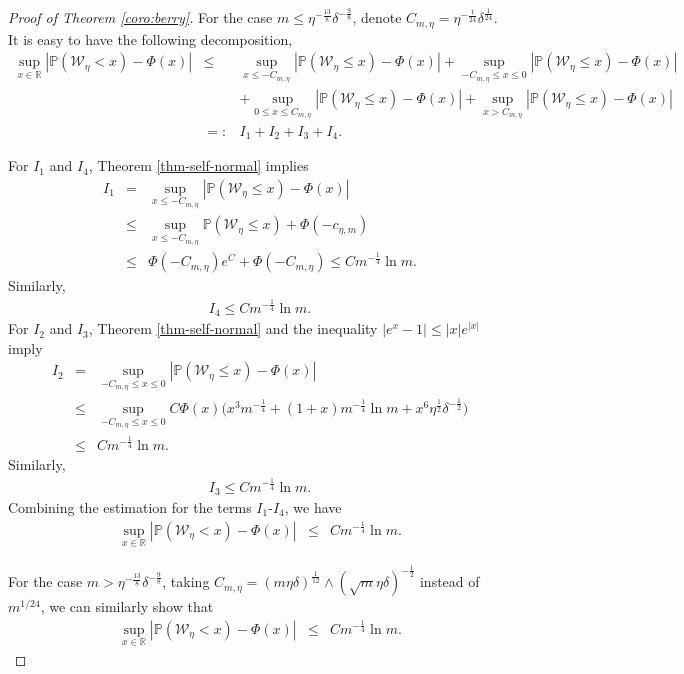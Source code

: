 \documentclass[12pt]{amsart}
\theoremstyle{definition}
\theoremstyle{remark}
\numberwithin{equation}{section}
\newcommand{\R}{\mathbb{R}}\newcommand{\RR}{\mathbb{R}}
\newcommand{\PP}{\mathbb{P}}
\begin{document}
\begin{proof}[Proof of Theorem \ref{coro:berry}]
For the case $m\le\eta^{-\frac{13}8}\delta^{-\frac98}$, denote $C_{m,\eta}=\eta^{{-\frac{1}{24}}}\delta^{\frac{1}{24}} $. It is easy to have the following decomposition,	
\begin{eqnarray*}
	\sup_{x\in\R}|\PP(\mathcal{W}_\eta< x)-\Phi(x)|&\le& 	\sup_{x\le -C_{m,\eta}}|\PP(\mathcal{W}_\eta\le x)-\Phi(x)|+\sup_{-C_{m,\eta}\le x\le 0 }|\PP(\mathcal{W}_\eta\le x)-\Phi(x)|\\
	&&+\sup_{0\le x\le C_{m,\eta}}|\PP(\mathcal{W}_\eta\le x)-\Phi(x)|+\sup_{x> C_{m,\eta}}|\PP(\mathcal{W}_\eta\le x)-\Phi(x)|\\
	&=:& I_1+I_2+I_3+I_4.
\end{eqnarray*}		


For $I_1$ and $I_4$,  Theorem \ref{thm-self-normal} implies
\begin{eqnarray*}
I_1&=& \sup_{x\le -C_{m,\eta}}|\PP(\mathcal{W}_\eta\le x)-\Phi(x)|\\
&\le& \sup_{x\le -C_{m,\eta}}\PP(\mathcal{W}_\eta\le x)+\Phi(-c_{\eta,m})\\
&\le& \Phi(-C_{m,\eta})e^C+\Phi(-C_{m,\eta})\le Cm^{-\frac14}\ln m.
\end{eqnarray*}
Similarly,
\begin{eqnarray*}
I_4\le Cm^{-\frac14}\ln m.
\end{eqnarray*}
For $I_2$ and $I_3$, Theorem \ref{thm-self-normal} and the inequality $|e^x-1|\le|x|e^{|x|}$ imply
	\begin{eqnarray*}
	I_2&=&\sup_{-C_{m,\eta}\le x\le 0 }|\PP(\mathcal{W}_\eta\le x)-\Phi(x)|\\
	&\le&\sup_{-C_{m,\eta}\le x\le 0 }C\Phi(x)\big(x^3m^{-\frac14}+(1+x)m^{-\frac14}\ln m+x^6\eta^{\frac12}\delta^{-\frac12}\big)\\
	&\le& Cm^{-\frac14}\ln m.
	\end{eqnarray*}
	Similarly,
\begin{eqnarray*}
		I_3\le Cm^{-\frac14}\ln m.
\end{eqnarray*}
Combining the estimation for the terms $I_1$-$I_4$, we have
\begin{eqnarray*}
	\sup_{x\in\R}|\PP(\mathcal{W}_\eta< x)-\Phi(x)|&\le& 	Cm^{-\frac14}\ln m.
\end{eqnarray*}		

For the case $m>\eta^{-\frac{13}8}\delta^{-\frac98}$, taking $C_{m,\eta}= (m\eta\delta)^{\frac1{12}}\wedge (\sqrt m\eta\delta)^{-\frac12}$ instead of $m^{1/24}$, we can similarly show that
\begin{eqnarray*}
	\sup_{x\in\R}|\PP(\mathcal{W}_\eta< x)-\Phi(x)|&\le& Cm^{-\frac14}\ln m.
\end{eqnarray*}		


\end{proof}
\end{document}
